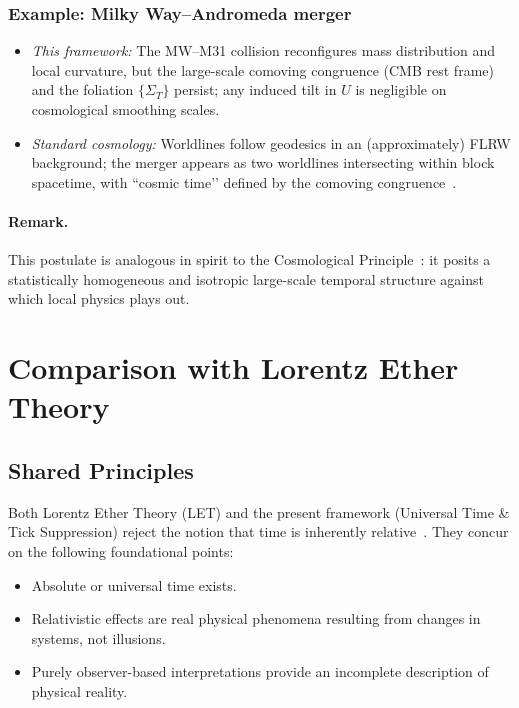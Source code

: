 \documentclass[12pt]{article}
\theoremstyle{plain} %
\begin{document}
\subsubsection*{Example: Milky Way--Andromeda merger}
\begin{itemize}
  \item \emph{This framework:} The MW–M31 collision reconfigures mass distribution and local curvature, but the large-scale comoving congruence (CMB rest frame) and the foliation \(\{\Sigma_T\}\) persist; any induced tilt in \(U\) is negligible on cosmological smoothing scales.
  \item \emph{Standard cosmology:} Worldlines follow geodesics in an (approximately) FLRW background; the merger appears as two worldlines intersecting within block spacetime, with “cosmic time’’ defined by the comoving congruence~\cite{Rindler2006}.
\end{itemize}

\paragraph{Remark.}
This postulate is analogous in spirit to the Cosmological Principle~\cite{Rindler2006}: it posits a statistically homogeneous and isotropic large-scale temporal structure against which local physics plays out.

\section*{Comparison with Lorentz Ether Theory}

\subsection*{Shared Principles}

Both Lorentz Ether Theory (LET) and the present framework (Universal Time \& Tick Suppression) reject the notion that time is inherently relative~\cite{Lorentz1904}. They concur on the following foundational points:

\begin{itemize}
  \item Absolute or universal time exists.
  \item Relativistic effects are real physical phenomena resulting from changes in systems, not illusions.
  \item Purely observer-based interpretations provide an incomplete description of physical reality.
\end{itemize}
\end{document}
